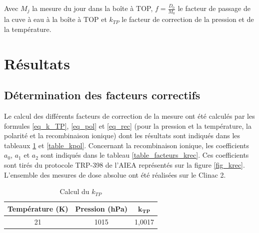 \documentclass{article}
\begin{document}
Avec $M_j$ la mesure du jour dans la boîte à TOP, $f = \frac{D_0}{M_0}$ le facteur de passage de la cuve à eau à la boîte à TOP et $k_{TP}$ le facteur de correction de la pression et de la température.

\newpage
\section{Résultats}
\subsection{Détermination des facteurs correctifs}

Le calcul des différents facteurs de correction de la mesure ont été calculés par les formules \ref*{eq_k_TP}, \ref*{eq_pol} et \ref*{eq_rec} (pour la pression et la température, la polarité et la recombinaison ionique) dont les résultats sont indiqués dans les tableaux \ref*{table_ktp} et \ref*{table_kpol}. Concernant la recombinaison ionique, les coefficients $a_0$, $a_1$ et $a_2$ sont indiqués dans le tableau \ref*{table_facteurs_krec}. Ces coefficients sont tirés du protocole TRP-398 de l'AIEA \cite{international2001iaea} représentés sur la figure \ref*{fig_krec}. L'ensemble des mesures de dose absolue ont été réalisées sur le Clinac 2.

\begin{table}[h]
  \centering
  \begin{tabular}{ccc}
    \toprule
    \textbf{Température (K)} & \textbf{Pression (hPa)} & $\mathbf{k_{TP}}$ \\
    \toprule
    21 & 1015 & 1,0017 \\
    \bottomrule
  \end{tabular}
  \caption{Calcul du $k_{TP}$}
  \label{table_ktp}
\end{table}
\end{document}
